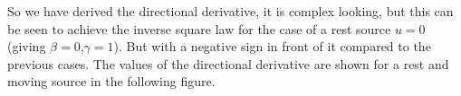 









So we have derived the directional derivative, it is complex looking, but this can be seen to achieve the inverse square law for the case of a rest source $u=0$ (giving $\beta=0$,$\gamma=1$).
But with a negative sign in front of it compared to the previous cases.
The values of the directional derivative are shown for a rest and moving source in the following figure.

